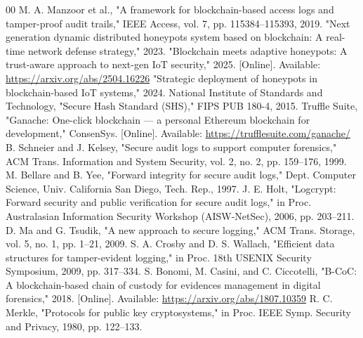 \documentclass[journal]{IEEEtran}
\begin{document}
\begin{thebibliography}{00}
 M. A. Manzoor et al., "A framework for blockchain-based access logs and tamper-proof audit trails," IEEE Access, vol. 7, pp. 115384--115393, 2019.
 "Next generation dynamic distributed honeypots system based on blockchain: A real-time network defense strategy," 2023.
 "Blockchain meets adaptive honeypots: A trust-aware approach to next-gen IoT security," 2025. [Online]. Available: \url{https://arxiv.org/abs/2504.16226}
 "Strategic deployment of honeypots in blockchain-based IoT systems," 2024.
 National Institute of Standards and Technology, "Secure Hash Standard (SHS)," FIPS PUB 180-4, 2015.
 Truffle Suite, "Ganache: One-click blockchain --- a personal Ethereum blockchain for development," ConsenSys. [Online]. Available: \url{https://trufflesuite.com/ganache/}
 B. Schneier and J. Kelsey, "Secure audit logs to support computer forensics," ACM Trans. Information and System Security, vol. 2, no. 2, pp. 159--176, 1999.
 M. Bellare and B. Yee, "Forward integrity for secure audit logs," Dept. Computer Science, Univ. California San Diego, Tech. Rep., 1997.
 J. E. Holt, "Logcrypt: Forward security and public verification for secure audit logs," in Proc. Australasian Information Security Workshop (AISW-NetSec), 2006, pp. 203--211.
 D. Ma and G. Tsudik, "A new approach to secure logging," ACM Trans. Storage, vol. 5, no. 1, pp. 1--21, 2009.
 S. A. Crosby and D. S. Wallach, "Efficient data structures for tamper-evident logging," in Proc. 18th USENIX Security Symposium, 2009, pp. 317--334.
 S. Bonomi, M. Casini, and C. Ciccotelli, "B-CoC: A blockchain-based chain of custody for evidences management in digital forensics," 2018. [Online]. Available: \url{https://arxiv.org/abs/1807.10359}
 R. C. Merkle, "Protocols for public key cryptosystems," in Proc. IEEE Symp. Security and Privacy, 1980, pp. 122--133.
\end{thebibliography}
\end{document}
